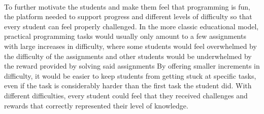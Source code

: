 \\
To further motivate the students and make them feel that programming is fun, the platform needed to support progress and different levels of difficulty so that every student can feel properly challenged. In the more classic educational model, practical programming tasks would usually only amount to a few assignments with large increases in difficulty, where some students would feel overwhelmed by the difficulty of the assignments and other students would be underwhelmed by the reward provided by solving said assignments
By offering smaller increments in difficulty, it would be easier to keep students from getting stuck at specific tasks, even if the task is considerably harder than the first task the student did. With different difficulties, every student could feel that they received challenges and rewards that correctly represented their level of knowledge.